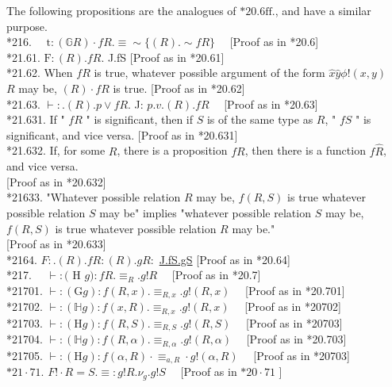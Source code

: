 \documentclass[10pt]{article}
\begin{document}
The following propositions are the analogues of $* 20.6 \mathrm{ff}$., and have a similar purpose.\\
*216. $\quad \mathrm{t}:(\mathbb{G} R) \cdot f R . \equiv \sim\{(R) . \sim f R\} \quad$ [Proof as in *20.6]\\
*21.61. $\mathrm{F}:(R) . f R$. J.fS [Proof as in *20.61]\\
*21.62. When $f R$ is true, whatever possible argument of the form $\hat{x} \hat{y} \phi!(x, y)$\\
$R$ may be, $(R) \cdot f R$ is true. [Proof as in *20.62]\\
*21.63. $\vdash: .(R) . p \vee f R$. J: $p . v .(R) . f R \quad$ [Proof as in *20.63]\\
*21.631. If " $f R$ " is significant, then if $S$ is of the same type as $R$, " $f S$ " is significant, and vice versa. [Proof as in *20.631]\\
*21.632. If, for some $R$, there is a proposition $f R$, then there is a function $f \hat{R}$, and vice versa.\\[0pt]
[Proof as in *20.632]\\
*21633. "Whatever possible relation $R$ may be, $f(R, S)$ is true whatever possible relation $S$ may be" implies "whatever possible relation $S$ may be, $f(R, S)$ is true whatever possible relation $R$ may be."\\[0pt]
[Proof as in *20.633]\\
*2164. $F: .(R) . f R:(R) . g R:$ \href{http://J.fS.gS}{J.fS.gS} [Proof as in *20.64]\\
*217. $\quad \vdash:($ H $g): f R . \equiv_{R} . g!R \quad$ [Proof as in *20.7]\\
*21701. $\vdash:(\mathrm{G} g): f(R, x) . \equiv_{R, x} . g!(R, x) \quad$ [Proof as in *20.701]\\
*21702. $\vdash:(\mathbb{H} g): f(x, R) . \equiv_{R, x} . g!(R, x) \quad$ [Proof as in *20702]\\
*21703. $\vdash:(\mathrm{H} g): f(R, S) . \equiv_{R, S} . g!(R, S) \quad$ [Proof as in *20703]\\
*21704. $\vdash:(\mathbb{H} g): f(R, \alpha) . \equiv_{R, \alpha} . g!(R, \alpha) \quad$ [Proof as in *20.703]\\
*21705. $\vdash:(\mathrm{H} g): f(\alpha, R) \cdot \equiv_{a, R} \cdot g!(\alpha, R) \quad$ [Proof as in *20703]\\
$* 21 \cdot 71$. $F!\cdot R=S . \equiv: g!R . \nu_{g} . g!S \quad$ [Proof as in $* 20 \cdot 71$ ]\\
\end{document}
